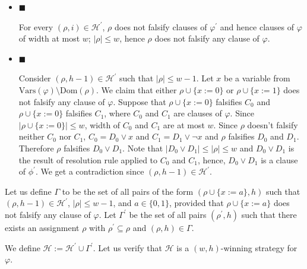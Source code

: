 \documentclass[10pt,a4paper]{article}
\begin{document}
\begin{itemize}


\item 
$\blacksquare$ 


For every $(\rho,i)\in\mathcal{H^{\prime}}$, $\rho$ does not falsify clauses of $\varphi^{\prime}$ and hence clauses of $\varphi$
of width at most $w$; $|\rho|\leq w$, hence $\rho$ does not falsify any clause of $\varphi$.\par





\item 
$\blacksquare$ 


Consider $(\rho,h-1)\in\mathcal{H^{\prime}}$ such that $|\rho|\leq w-1$. Let $x$ be a variable from $\mathrm{Vars}(\varphi)\setminus\mathrm{Dom}(\rho)$.
We claim that either $\rho\cup\{x:=0\}$ or $\rho\cup\{x:=1\}$ does not falsify any clause of $\varphi$.
Suppose that $\rho\cup\{x:=0\}$ falsifies $C_{0}$ and $\rho\cup\{x:=0\}$ falsifies $C_{1}$, where $C_{0}$ and $C_{1}$ are clauses of $\varphi$.
Since $|\rho\cup\{x:=0\}|\leq w$, width of $C_{0}$ and $C_{1}$ are at most $w$.
Since $\rho$ doesn’t falsify neither $C_{0}$ nor $C_{1}$,
$C_{0}=D_{0}\lor x$ and $C_{1}=D_{1}\lor\lnot x$ and $\rho$ falsifies $D_{0}$ and $D_{1}$.
Therefore $\rho$ falsifies $D_{0}\lor D_{1}$.
Note that $|D_{0}\lor D_{1}|\leq|\rho|\leq w$ and $D_{0}\lor D_{1}$ is the result of resolution rule applied to $C_{0}$ and $C_{1}$,
hence, $D_{0}\lor D_{1}$ is a clause of $\phi^{\prime}$.
We get a contradiction since $(\rho,h-1)\in\mathcal{H^{\prime}}$.\par





\end{itemize}


Let us define $\Gamma$ to be the set of all pairs of the form $(\rho\cup\{x:=a\},h)$ such that
$(\rho,h-1)\in\mathcal{H^{\prime}}$, $|\rho|\leq w-1$, and $a\in\{0,1\}$, provided that $\rho\cup\{x:=a\}$
does not falsify any clause of $\varphi$.
Let $\Gamma^{\prime}$ be the set of all pairs $(\rho^{\prime},h)$ such that there exists an assignment
$\rho$ with $\rho^{\prime}\subseteq\rho$ and $(\rho,h)\in\Gamma$.\par



We define $\mathcal{H}:=\mathcal{H^{\prime}}\cup\Gamma^{\prime}$.
Let us verify that $\mathcal{H}$ is a $(w,h)$-winning strategy for $\varphi$.\par
\end{document}
